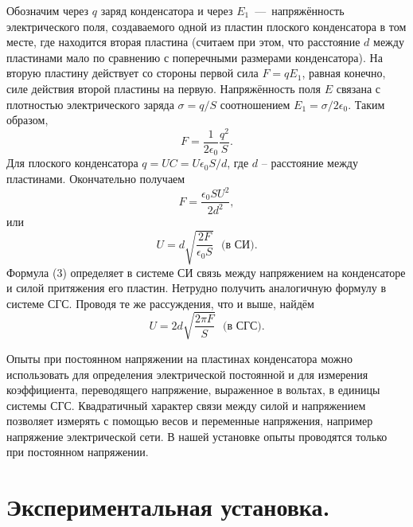 Обозначим через $q$ заряд конденсатора и через $E_1$~—~напряжённость электрического поля, создаваемого одной из пластин плоского конденсатора в том месте, где находится вторая пластина (считаем при этом, что расстояние $d$ между пластинами мало по сравнению с поперечными размерами конденсатора). На вторую пластину действует со стороны первой сила $F = qE_1$, равная конечно, силе действия второй пластины на первую. Напряжённость поля $E$ связана с плотностью электрического заряда $\sigma = q/S$ соотношением $E_1 = \sigma /{2\epsilon_0}$. Таким образом, 
\begin{equation}\label{1}
     F = \frac{1}{2\epsilon_0}\frac{q^2}{S}.
\end{equation}
Для плоского конденсатора $q = UC = U\epsilon_0 S/d$, где $d$ -- расстояние между пластинами. Окончательно получаем
\begin{equation}\label{2}
     F = \frac{\epsilon_0 SU^2}{2d^2},
\end{equation}
или
\begin{equation}\label{3}
     U = d\sqrt{\frac{2F}{\epsilon_0 S}}\text{~~(в СИ)}.
\end{equation}
Формула (3) определяет в системе СИ связь между напряжением на
конденсаторе и силой притяжения его пластин. Нетрудно получить аналогичную формулу в системе СГС. Проводя те же рассуждения, что и выше, найдём
\begin{equation}\label{4}
     U = 2d\sqrt{\frac{2\pi F}{S}}\text{~~(в СГС).}
\end{equation}

    Опыты при постоянном напряжении на пластинах конденсатора
можно использовать для определения электрической постоянной и
для измерения коэффициента, переводящего напряжение, выраженное
в вольтах, в единицы системы СГС. Квадратичный характер связи между силой и напряжением позволяет измерять с помощью весов и переменные напряжения, например напряжение электрической сети. В нашей установке опыты проводятся только при постоянном напряжении.

\section{\label{sec:level1}Экспериментальная установка.}

